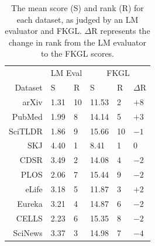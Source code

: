 \begin{table}[h]
\vspace{-2mm}
\centering \footnotesize
\begin{tabular}{r|ll|lll}
 & \multicolumn{2}{c|}{LM Eval} & \multicolumn{3}{c}{FKGL} \\
Dataset & S & R & S & R & $\Delta$R \\ \hline
arXiv & 1.31 & 10 & 11.53 & 2 & $+8$ \\
PubMed & 1.99 & 8 & 14.14 & 5 & $+3$ \\
SciTLDR & 1.86 & 9 & 15.66 & 10 & $-1$ \\
SKJ & 4.40 & 1 & 8.41 & 1 & $0$ \\
CDSR & 3.49 & 2 & 14.08 & 4 & $-2$ \\
PLOS & 2.06 & 7 & 15.44 & 9 & $-2$ \\
eLife & 3.18 & 5 & 11.87 & 3 & $+2$ \\
Eureka & 3.21 & 4 & 14.87 & 6 & $-2$ \\
CELLS & 2.23 & 6 & 15.35 & 8 & $-2$ \\
SciNews & 3.37 & 3 & 14.98 & 7 & $-4$
\end{tabular}
\caption[The mean score and rank for each dataset, as judged by an LM evaluator and FKGL.]{The mean score (S) and rank (R) for each dataset, as judged by an LM evaluator and FKGL. $\Delta$R represents the change in rank from the LM evaluator to the FKGL scores.}\label{tab:ranked-datasets}
\end{table}